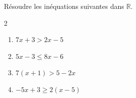 \begin{exo}{}
	Résoudre les inéquations suivantes dans $\mathbb{R}$.
	\vspace*{-2mm}\begin{multicols}{2}
		\begin{enumerate}[itemsep=2mm]
			\item $7x + 3 > 2x - 5$
			\item $5x - 3 \leqslant 8x - 6$
			\item $7(x + 1) > 5 - 2x$
			\item $-5x + 3 \geqslant 2(x - 5)$
		\end{enumerate}
	\end{multicols}
\end{exo}
